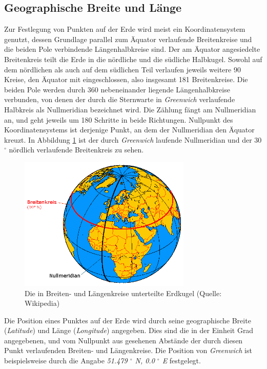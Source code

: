 \subsection{Geographische Breite und Länge}
Zur Festlegung von Punkten auf der Erde wird meist ein
Koordinatensystem genutzt, dessen Grundlage parallel zum Äquator
verlaufende Breitenkreise und die beiden Pole verbindende
Längenhalbkreise sind. Der am Äquator angesiedelte Breitenkreis teilt
die Erde in die nördliche und die südliche Halbkugel. Sowohl auf dem
nördlichen als auch auf dem südlichen Teil verlaufen jeweils weitere
90 Kreise, den Äquator mit eingeschlossen, also insgesamt 181
Breitenkreise. Die beiden Pole werden durch 360 nebeneinander liegende
Längenhalbkreise verbunden, von denen der durch die Sternwarte in
\textit{Greenwich} verlaufende Halbkreis als Nullmeridian bezeichnet
wird. Die Zählung fängt am Nullmeridian an, und geht jeweils um 180
Schritte in beide Richtungen. Nullpunkt des Koordinatensystems ist
derjenige Punkt, an dem der Nullmeridian den Äquator kreuzt. In
Abbildung \ref{koordinaten} ist der durch \textit{Greenwich} laufende
Nullmeridian und der 30 $^\circ$ nördlich verlaufende Breitenkreis zu
sehen.

\begin{figure}[h]
  \includegraphics[width=310px]{bilder/koordinaten}
  \caption{Die in Breiten- und Längenkreise unterteilte Erdkugel (Quelle: Wikipedia)}
  \label{koordinaten}
\end{figure}

Die Position eines Punktes auf der Erde wird durch seine geographische
Breite (\textit{Latitude}) und Länge (\textit{Longitude})
angegeben. Dies sind die in der Einheit Grad angegebenen, und vom
Nullpunkt aus gesehenen Abstände der durch diesen Punkt verlaufenden
Breiten- und Längenkreise. Die Position von \textit{Greenwich} ist
beispielsweise durch die Angabe \textit{51.479 $^\circ$ N, 0.0
  $^\circ$ E} festgelegt.



